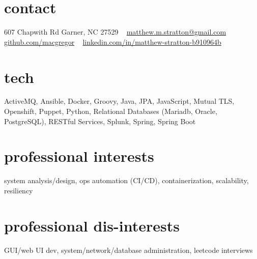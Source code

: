 
\begin{aside_p1} %
\section{contact}
607 Chapwith Rd
Garner, NC 27529
~
\href{mailto:matthew.m.stratton@gmail.com}{\small{matthew.m.stratton@gmail.com}}
~
\href{https://github.com/macgregor}{github.com/macgregor}
~
\href{https://www.linkedin.com/in/matthew-stratton-b910964b}{\small{linkedin.com/in/matthew-stratton-b910964b}}
\section{tech}
ActiveMQ, Ansible, Docker, Groovy, Java, JPA, JavaScript, Mutual TLS, Openshift, Puppet, Python, Relational Databases (Mariadb, Oracle, PostgreSQL), RESTful Services, Splunk, Spring, Spring Boot
\section{professional interests}
system analysis/design, ops automation (CI/CD), containerization, scalability, resiliency
~
\section{professional dis-interests}
GUI/web UI dev, system/network/database administration, leetcode interviews
\end{aside_p1}
